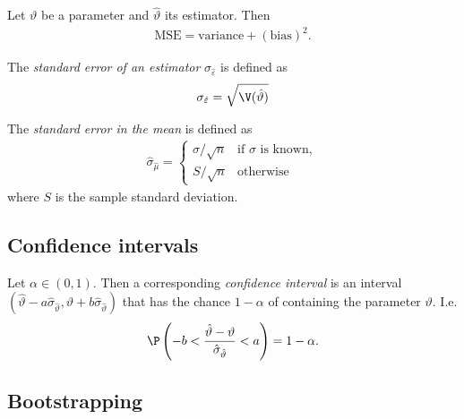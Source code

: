 \documentclass{article}
\begin{document}
\begin{theorem}
	Let $\vartheta$ be a parameter and $\hat\vartheta$ its estimator.
	Then
	\begin{align*}
		\text{MSE}=\text{variance}+(\text{bias})^2.
	\end{align*}
\end{theorem}

\begin{definition}
	The \emph{standard error of an estimator} $\sigma_{\hat\varepsilon}$
	is defined as
	\begin{align*}
		\sigma_{\hat\varepsilon}=\sqrt{\V(\hat\vartheta)}
	\end{align*}
\end{definition}

\begin{definition}
	The \emph{standard error in the mean} is defined as
	\begin{align*}
		\hat\sigma_{\hat\mu}=
		\begin{cases}
			\sigma/\sqrt{n} &\text{if $\sigma$ is known},\\
			S/\sqrt{n} &\text{otherwise}
		\end{cases}
	\end{align*}
	where $S$ is the sample standard deviation.	
\end{definition}

\subsection{Confidence intervals}

\begin{definition}
	Let $\alpha\in(0,1)$. Then a corresponding \emph{confidence interval}
	is an interval $(\hat\vartheta-a\hat\sigma_{\hat\vartheta}, \hat\vartheta+b\hat\sigma_{\hat\vartheta})$
	that has the chance $1-\alpha$ of containing the parameter $\vartheta$.
	I.e.
	\begin{align*}
		\P\left(-b < \frac{\hat\vartheta-\vartheta}{\hat\sigma_{\hat\vartheta}}<a\right) = 1-\alpha.
	\end{align*}
\end{definition}

\subsection{Bootstrapping}
\end{document}
